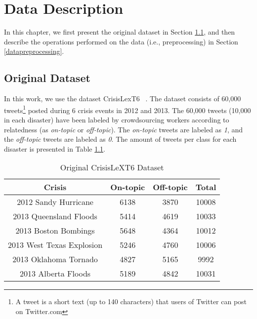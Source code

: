 \cleardoublepage

\chapter{Data Description}
\label{datadescription}

In this chapter, we first present the original dataset in Section \ref{originaldataset}, and then describe the operations performed on the data (i.e., preprocessing) in Section \ref{datapreprocessing}. 

\section{Original Dataset}
\label{originaldataset}

In this work, we use the dataset CrisisLexT6 ~\citep{data}. The dataset consists of 60,000 tweets\footnote{A tweet is a short text (up to 140 characters) that users of Twitter can post on Twitter.com} posted during 6 crisis events in 2012 and 2013. The 60,000 tweets (10,000 in each disaster) have been labeled by crowdsourcing workers according to relatedness (as \textit{on-topic} or \textit{off-topic}). The \textit{on-topic} tweets are labeled as \textit{1}, and the \textit{off-topic} tweets are labeled as \textit{0}. The amount of tweets per class for each disaster is presented in Table \ref{originaldatasettable}.

\begin{table}[ht]
    \begin{center}
    \caption{Original CrisisLeXT6 Dataset}
    \begin{tabular}[c]{|c|c|c|c|}
        \hline
        Crisis & On-topic & Off-topic & Total \\
        \hline
        2012 Sandy Hurricane & 6138 & 3870 & 10008 \\
        2013 Queensland Floods & 5414 & 4619 & 10033 \\ 
        2013 Boston Bombings & 5648 & 4364 & 10012 \\ 
        2013 West Texas Explosion & 5246 & 4760 & 10006 \\
        2013 Oklahoma Tornado & 4827 & 5165 & 9992 \\
        2013 Alberta Floods & 5189 & 4842 & 10031 \\
        \hline
    \end{tabular}
    \label{originaldatasettable}
   \end{center}
\end{table}



